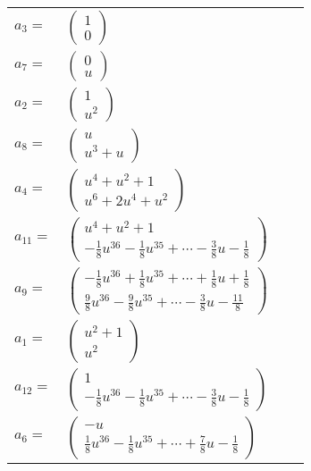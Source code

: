\documentclass[1p]{elsarticle_modified}
\theoremstyle{definition}
\begin{document}
\begin{tabular}{m{7pt} m{180pt} m{7pt} m{180pt} }
\flushright $a_{3}=$&$\begin{pmatrix}1\\0\end{pmatrix}$ \\
\flushright $a_{7}=$&$\begin{pmatrix}0\\u\end{pmatrix}$ \\
\flushright $a_{2}=$&$\begin{pmatrix}1\\u^2\end{pmatrix}$ \\
\flushright $a_{8}=$&$\begin{pmatrix}u\\u^3+u\end{pmatrix}$ \\
\flushright $a_{4}=$&$\begin{pmatrix}u^4+u^2+1\\u^6+2 u^4+u^2\end{pmatrix}$ \\
\flushright $a_{11}=$&$\begin{pmatrix}u^4+u^2+1\\-\frac{1}{8} u^{36}-\frac{1}{8} u^{35}+\cdots-\frac{3}{8} u-\frac{1}{8}\end{pmatrix}$ \\
\flushright $a_{9}=$&$\begin{pmatrix}-\frac{1}{8} u^{36}+\frac{1}{8} u^{35}+\cdots+\frac{1}{8} u+\frac{1}{8}\\\frac{9}{8} u^{36}-\frac{9}{8} u^{35}+\cdots-\frac{3}{8} u-\frac{11}{8}\end{pmatrix}$ \\
\flushright $a_{1}=$&$\begin{pmatrix}u^2+1\\u^2\end{pmatrix}$ \\
\flushright $a_{12}=$&$\begin{pmatrix}1\\-\frac{1}{8} u^{36}-\frac{1}{8} u^{35}+\cdots-\frac{3}{8} u-\frac{1}{8}\end{pmatrix}$ \\
\flushright $a_{6}=$&$\begin{pmatrix}- u\\\frac{1}{8} u^{36}-\frac{1}{8} u^{35}+\cdots+\frac{7}{8} u-\frac{1}{8}\end{pmatrix}$ \\

\end{tabular}
\end{document}
